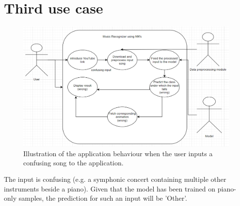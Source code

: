 \section{Third use case}

\begin{figure}[H]
	\centering
	\includegraphics[width = 4.5in]{images/usecase2.png}
	\caption{Illustration of the application behaviour when the user inputs a confusing song to the application.}
	\label{uc2}
	\end{figure}
 The input is confusing (e.g. a symphonic concert containing multiple other instruments beside a piano). Given that the model has been trained on piano-only samples, the prediction for such an input will be 'Other'.
